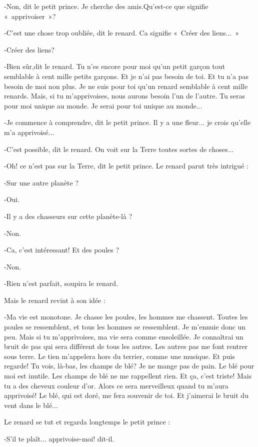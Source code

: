 \documentclass{report}
\begin{document}
\begin{paracol}{2}
-Non, dit le petit prince. Je cherche des amis.Qu'est-ce que signifie «~apprivoiser~»?

-C'est une chose trop oubliée, dit le renard. Ca signifie «~Créer des liens...~»

-Créer des liens?

-Bien sûr,dit le renard. Tu n'es encore pour moi qu'un petit garçon tout semblable à cent mille petits garçons. Et je n'ai pas besoin de toi. Et tu n'a pas besoin de moi non plus. Je ne suis pour toi qu'un renard semblable à cent mille renards. Mais, si tu m'apprivoises, nous aurons besoin l'un de l'autre. Tu seras pour moi unique au monde. Je serai pour toi unique au monde...

-Je commence à comprendre, dit le petit prince. Il y a une fleur... je crois qu'elle m'a apprivoisé...

-C'est possible, dit le renard. On voit sur la Terre toutes sortes de choses...

-Oh! ce n'est pas sur la Terre, dit le petit prince. Le renard parut très intrigué :

-Sur une autre planète ?

-Oui.

-Il y a des chasseurs sur cette planète-là ?

-Non.

-Ca, c'est intéressant! Et des poules ?

-Non.

-Rien n'est parfait, soupira le renard.

Mais le renard revint à son idée :

-Ma vie est monotone. Je chasse les poules, les hommes me chassent. Toutes les poules se ressemblent, et tous les hommes se ressemblent. Je m'ennuie donc un peu. Mais si tu m'apprivoises, ma vie sera comme ensoleillée. Je connaîtrai un bruit de pas qui sera différent de tous les autres. Les autres pas me font rentrer sous terre. Le tien m'appelera hors du terrier, comme une musique. Et puis regarde! Tu vois, là-bas, les champs de blé? Je ne mange pas de pain. Le blé pour moi est inutile. Les champs de blé ne me rappellent rien. Et ça, c'est triste! Mais tu a des cheveux couleur d'or. Alors ce sera merveilleux quand tu m'aura apprivoisé! Le blé, qui est doré, me fera souvenir de toi. Et j'aimerai le bruit du vent dans le blé...

Le renard se tut et regarda longtemps le petit prince :

-S'il te plaît... apprivoise-moi! dit-il.


\end{paracol}
\end{document}
